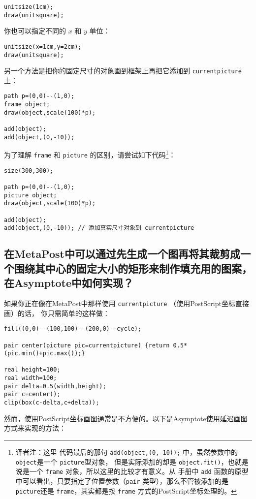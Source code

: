 \begin{lstlisting}
unitsize(1cm);
draw(unitsquare);
\end{lstlisting}
你也可以指定不同的 $x$ 和 $y$ 单位：
\begin{lstlisting}
unitsize(x=1cm,y=2cm);
draw(unitsquare);
\end{lstlisting}
另一个方法是把你的固定尺寸的对象画到框架上再把它添加到 \verb|currentpicture| 上：
\begin{lstlisting}
path p=(0,0)--(1,0);
frame object;
draw(object,scale(100)*p);
 
add(object);
add(object,(0,-10));
\end{lstlisting}
为了理解 \verb|frame| 和 \verb|picture| 的区别，请尝试如下代码\footnote{译者注：这里
代码最后的那句 \verb|add(object,(0,-10));| 中，虽然参数中的 \verb|object|是一个 \verb|picture|型对象，
但是实际添加的却是 \verb|object.fit()|，也就是说是一个 \verb|frame| 对象，所以这里的比较才有意义。从
手册中 \verb|add| 函数的原型中可以看出，只要指定了位置参数（\verb|pair| 类型），那么不管被添加的是 \verb|picture|还是
\verb|frame|，其实都是按 \verb|frame| 方式的PostScript坐标处理的。}：
~\\[-5mm]
\begin{lstlisting}
size(300,300);
 
path p=(0,0)--(1,0);
picture object;
draw(object,scale(100)*p);
 
add(object);
add(object,(0,-10)); // 添加真实尺寸对象到 currentpicture 
\end{lstlisting}

\subsection{\label{Q8.9}在MetaPost中可以通过先生成一个图再将其裁剪成一个围绕其中心的固定大小的矩形来制作填充用的图案，在Asymptote中如何实现？}
如果你正在像在MetaPost中那样使用 \verb|currentpicture| （使用PostScript坐标直接画）的话，
你只需简单的这样做：
\begin{lstlisting}
fill((0,0)--(100,100)--(200,0)--cycle);
 
pair center(picture pic=currentpicture) {return 0.5*(pic.min()+pic.max());} 
 
real height=100;
real width=100;
pair delta=0.5(width,height);
pair c=center();
clip(box(c-delta,c+delta));
\end{lstlisting}

然而，使用PostScript坐标画图通常是不方便的。以下是Asymptote使用延迟画图方式来实现的方法：

